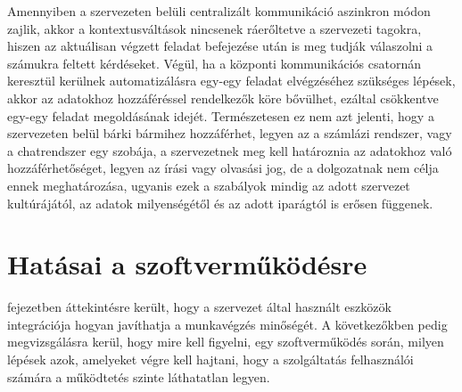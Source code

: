 Amennyiben a szervezeten belüli centralizált kommunikáció aszinkron módon zajlik, akkor a kontextusváltások nincsenek ráerőltetve a szervezeti tagokra, hiszen az aktuálisan végzett feladat befejezése után is meg tudják válaszolni a számukra feltett kérdéseket.
Végül, ha a központi kommunikációs csatornán keresztül kerülnek automatizálásra egy-egy feladat elvégzéséhez szükséges lépések, akkor az adatokhoz hozzáféréssel rendelkezők köre bővülhet, ezáltal csökkentve egy-egy feladat megoldásának idejét.
Természetesen ez nem azt jelenti, hogy a szervezeten belül bárki bármihez hozzáférhet, legyen az a számlázi rendszer, vagy a chatrendszer egy szobája, a szervezetnek meg kell határoznia az adatokhoz való hozzáférhetőséget, legyen az írási vagy olvasási jog, de a dolgozatnak nem célja ennek meghatározása, ugyanis ezek a szabályok mindig az adott szervezet kultúrájától, az adatok milyenségétől és az adott iparágtól is erősen függenek.

\section[Hatásai a szoftverműködésre]{Hatásai a szoftverműködésre%
  }

 fejezetben áttekintésre került, hogy a szervezet által használt eszközök integrációja hogyan javíthatja a munkavégzés minőségét. A következőkben pedig megvizsgálásra kerül, hogy mire kell figyelni, egy szoftverműködés során, milyen lépések azok, amelyeket végre kell hajtani, hogy a szolgáltatás felhasználói számára a működtetés szinte láthatatlan legyen.

